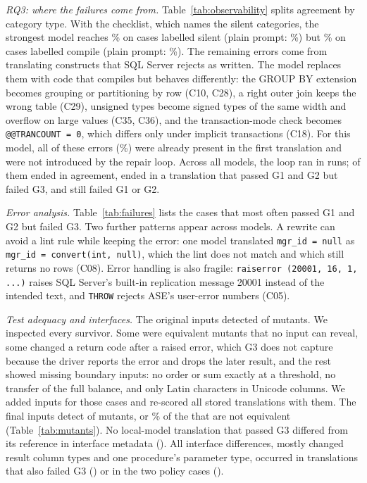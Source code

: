 
\textit{RQ3: where the failures come from.} Table~\ref{tab:observability} splits agreement by category
type. With the checklist, which names the silent categories, the strongest model reaches
\AgenticSilentClassEquiv\% on cases labelled silent (plain prompt: \PlainSilentClassEquiv\%) but
\AgenticCompileClassEquiv\% on cases labelled compile (plain prompt: \PlainCompileClassEquiv\%). The
remaining errors come from translating constructs that SQL Server rejects as written. The model replaces
them with code that compiles but behaves differently: the GROUP BY extension becomes grouping or
partitioning by row (C10, C28), a right outer join keeps the wrong table (C29), unsigned types become signed
types of the same width and overflow on large values (C35, C36), and the transaction-mode check becomes
\texttt{@@TRANCOUNT = 0}, which differs only under implicit transactions (C18). For this model, all of these
errors (\BestSilentFirstAttempt\%) were already present in the first translation and were not introduced by
the repair loop. Across all models, the loop ran in \RepairRuns{} runs; \RepairToPass{} of them ended in
agreement, \RepairToSilent{} ended in a translation that passed G1 and G2 but failed G3, and
\RepairStillLoud{} still failed G1 or G2.


\textit{Error analysis.} Table~\ref{tab:failures} lists the cases that most often passed G1 and G2 but
failed G3. Two further patterns appear across models. A rewrite can avoid a lint rule while keeping the
error: one model translated \texttt{mgr\_id = null} as \texttt{mgr\_id = convert(int, null)}, which the
lint does not match and which still returns no rows (C08). Error handling is also fragile:
\texttt{raiserror (20001, 16, 1, ...)} raises SQL Server's built-in replication message 20001 instead of
the intended text, and \texttt{THROW} rejects ASE's user-error numbers (C05).

\textit{Test adequacy and interfaces.} The original inputs detected \MutKilledInitial{} of
\MutTotalInitial{} mutants. We inspected every survivor. Some were equivalent mutants that no input can
reveal, some changed a return code after a raised error, which G3 does not capture because the driver
reports the error and drops the later result, and the rest showed missing boundary inputs: no order or sum
exactly at a threshold, no transfer of the full balance, and only Latin characters in Unicode columns. We
added inputs for those cases and re-scored all stored translations with them. The final inputs detect
\MutKilled{} of \MutTotal{} mutants, or \MutScoreNonEquiv\% of the \MutNonEquiv{} that are not
equivalent (Table~\ref{tab:mutants}).
No local-model translation that passed G3 differed from its reference in interface metadata
(\IfaceDiffN). All \IfaceAnyN{} interface differences, mostly changed result column types and one
procedure's parameter type, occurred in translations that also failed G3 (\IfaceFailN) or in the two
policy cases (\IfacePolicyN).


